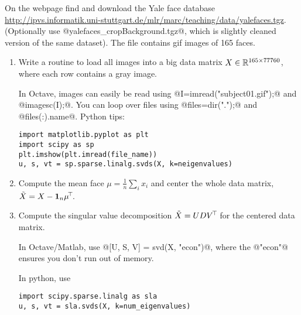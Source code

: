 \fi



On the webpage find and download the Yale face database
{\tiny\url{http://ipvs.informatik.uni-stuttgart.de/mlr/marc/teaching/data/yalefaces.tgz}}.
(Optionally use @yalefaces_cropBackground.tgz@, which is slightly cleaned
version of the same dataset). The file contains gif images of 165 faces.

\begin{enumerate}
\item Write a routine to load all images into a big data matrix $X \in
{\mathbb{R}}^{165\times 77760}$, where each row contains a gray image.

In Octave, images can easily be read using
@I=imread("subject01.gif");@ and @imagesc(I);@. You can loop over
files using @files=dir(".");@ and @files(:).name@. Python tips:
\begin{code}
\begin{verbatim}
import matplotlib.pyplot as plt
import scipy as sp
plt.imshow(plt.imread(file_name))
u, s, vt = sp.sparse.linalg.svds(X, k=neigenvalues)
\end{verbatim}
\end{code}

\item Compute the mean face $\mu = \frac{1}{n} \sum_i x_i$ and center the whole
data matrix, $\tilde X = X - {{\bf 1}}_n \mu^{\!\top\!}$.

\item Compute the singular value decomposition $\tilde X = U D V^{\!\top\!}$ for the
centered data matrix.

In Octave/Matlab, use @[U, S, V] = svd(X, "econ")@, where the @"econ"@ ensures
you don't run out of memory.

In python, use 
\begin{code}
\begin{verbatim}
import scipy.sparse.linalg as sla 
u, s, vt = sla.svds(X, k=num_eigenvalues)
\end{verbatim}
\end{code}


\end{enumerate}
